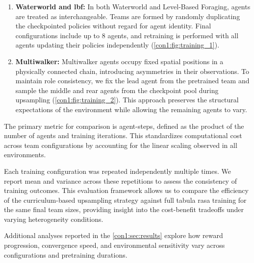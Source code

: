 \documentclass{article}
\begin{document}
\begin{enumerate}
    \item \textbf{Waterworld and \gls{lbf}:}
    In both Waterworld and Level-Based Foraging, agents are treated as interchangeable. 
    Teams are formed by randomly duplicating the checkpointed policies without regard 
    for agent identity. Final configurations include up to 8 agents, and retraining is 
    performed with all agents updating their policies independently (\cref{con1:fig:training_1}).
    \item \textbf{Multiwalker:}
    Multiwalker agents occupy fixed spatial positions in a physically connected chain, 
    introducing asymmetries in their observations. To maintain role consistency, 
    we fix the lead agent from the pretrained team and sample the middle and rear 
    agents from the checkpoint pool during upsampling (\cref{con1:fig:training_2}). 
    This approach preserves the structural expectations of the environment while 
    allowing the remaining agents to vary. 
\end{enumerate}

The primary metric for comparison is agent-steps, defined as the product of the number of 
agents and training iterations. This standardizes computational cost across team configurations 
by accounting for the linear scaling observed in all environments.

Each training configuration was repeated independently multiple times. We report mean and 
variance across these repetitions to assess the consistency of training outcomes. 
This evaluation framework allows us to compare the efficiency of the curriculum-based 
upsampling strategy against full tabula rasa training for the same final team sizes, 
providing insight into the cost-benefit tradeoffs under varying heterogeneity conditions.

Additional analyses reported in the \cref{con1:sec:results} explore how reward progression, 
convergence speed, and environmental sensitivity vary across configurations and 
pretraining durations.
\end{document}
